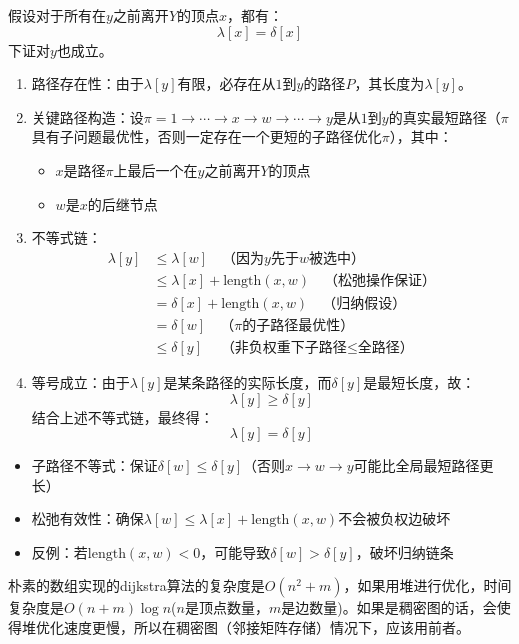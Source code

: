 \documentclass[./../main.tex]{subfiles}
\begin{document}
假设对于所有在$y$之前离开$Y$的顶点$x$，都有：
$$
\lambda[x] = \delta[x]
$$
下证对$y$也成立。
\begin{enumerate}
    \item 路径存在性：由于$\lambda[y]$有限，必存在从$1$到$y$的路径$P$，其长度为$\lambda[y]$。
    
    \item 关键路径构造：设$\pi = 1 \to \cdots \to x \to w \to \cdots \to y$是从$1$到$y$的真实最短路径（$\pi$具有子问题最优性，否则一定存在一个更短的子路径优化$\pi$），其中：
    \begin{itemize}
        \item $x$是路径$\pi$上最后一个在$y$之前离开$Y$的顶点
        \item $w$是$x$的后继节点
    \end{itemize}
    
    \item 不等式链：
    \begin{align*}
        \lambda[y] &\leq \lambda[w] \quad \text{（因为$y$先于$w$被选中）} \\
                   &\leq \lambda[x] + \text{length}(x,w) \quad \text{（松弛操作保证）} \\
                   &= \delta[x] + \text{length}(x,w) \quad \text{（归纳假设）} \\
                   &= \delta[w] \quad \text{（$\pi$的子路径最优性）} \\
                   &\leq \delta[y] \quad \text{（非负权重下子路径$\leq$全路径）}
    \end{align*}
    
    \item 等号成立：由于$\lambda[y]$是某条路径的实际长度，而$\delta[y]$是最短长度，故：
    $$
    \lambda[y] \geq \delta[y]
    $$
    结合上述不等式链，最终得：
    $$
    \lambda[y] = \delta[y]
    $$
\end{enumerate}

\begin{itemize}
    \item 子路径不等式：保证$\delta[w] \leq \delta[y]$（否则$x \to w \to y$可能比全局最短路径更长）
    \item 松弛有效性：确保$\lambda[w] \leq \lambda[x] + \text{length}(x,w)$不会被负权边破坏
    \item 反例：若$\text{length}(x,w)<0$，可能导致$\delta[w] > \delta[y]$，破坏归纳链条
\end{itemize}

朴素的数组实现的dijkstra算法的复杂度是$O(n^2+m)$，如果用堆进行优化，时间复杂度是$O(n+m)\log n$($n$是顶点数量，$m$是边数量)。如果是稠密图的话，会使得堆优化速度更慢，所以在稠密图（邻接矩阵存储）情况下，应该用前者。
\end{document}
